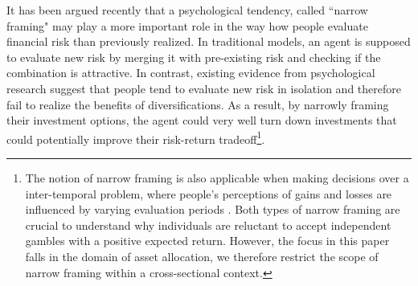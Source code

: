 \documentclass[ukenglish,nottitlepage,thmsb,11pt,letterpaper]{article}
\begin{document}
It has been argued recently that a psychological tendency, called ``narrow framing" may play a more important role in the way how people evaluate financial risk than previously realized. In traditional models, an agent is supposed to evaluate new risk by merging it with pre-existing risk and checking if the combination is attractive. In contrast, existing evidence from psychological research \citep[e.g.,][]{Barberis2006,Anagola2013,Beshears2016} suggest that people tend to evaluate new risk in isolation and therefore fail to realize the benefits of diversifications. As a result, by narrowly framing their investment options, the agent could very well turn down investments that could potentially improve their risk-return tradeoff\footnote{The notion of narrow framing is also applicable when making decisions over a inter-temporal problem, where people's perceptions of gains and losses are influenced by varying evaluation periods \citep{Thaler1997,Benartzi1999,Gneezy2003}. Both types of narrow framing are crucial to understand why individuals are reluctant to accept independent gambles with a positive expected return. However, the focus in this paper falls in the domain of asset allocation, we therefore restrict the scope of narrow framing within a cross-sectional context.}.
\end{document}
